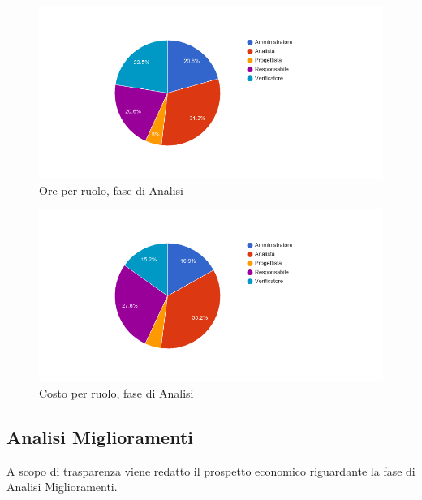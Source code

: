\begin{figure}[H]
  \begin{center}
    \includegraphics[width=15cm]{res/img/prospettoEconomico/orePerRuoloAnalisi.png}
  \caption{Ore per ruolo, fase di Analisi}
  \end{center} 
\end{figure}  

\begin{figure}[H]
  \begin{center}
    \includegraphics[width=15cm]{res/img/prospettoEconomico/costoPerRuoloAnalisi.png}
  \caption{Costo per ruolo, fase di Analisi}
  \end{center} 
\end{figure}  


\subsection{Analisi Miglioramenti}
A scopo di trasparenza viene redatto il prospetto economico riguardante la fase di Analisi Miglioramenti.

